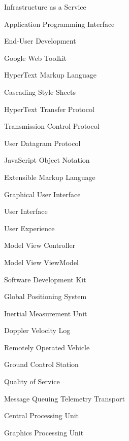 
{Infrastructure as a Service}

{Application Programming Interface}

{End-User Development}

{Google Web Toolkit}

{HyperText Markup Language}

{Cascading Style Sheets}

{HyperText Transfer Protocol}

{Transmission Control Protocol}

{User Datagram Protocol}

{JavaScript Object Notation}

{Extensible Markup Language}

{Graphical User Interface}

{User Interface}

{User Experience}

{Model View Controller}

{Model View ViewModel}

{Software Development Kit}

{Global Positioning System}

{Inertial Measurement Unit}

{Doppler Velocity Log}

{Remotely Operated Vehicle}

{Ground Control Station}

{Quality of Service}

{Message Queuing Telemetry Transport}

{Central Processing Unit}

{Graphics Processing Unit}